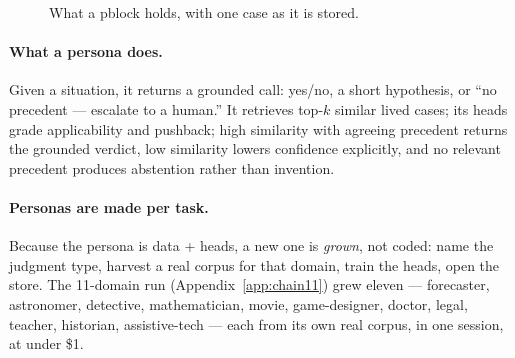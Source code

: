 \documentclass[11pt]{article}
\begin{document}
\begin{figure}[htbp]
\centering
{}
\caption{What a pblock holds, with one case as it is stored.}
\label{fig:keyidea}
\end{figure}

\paragraph{What a persona does.} Given a situation, it returns a grounded call: yes/no, a short hypothesis, or ``no precedent --- escalate to a human.'' It retrieves top-$k$ similar lived cases; its heads grade applicability and pushback; high similarity with agreeing precedent returns the grounded verdict, low similarity lowers confidence explicitly, and no relevant precedent produces abstention rather than invention.

\paragraph{Personas are made per task.} Because the persona is data + heads, a new one is \emph{grown}, not coded: name the judgment type, harvest a real corpus for that domain, train the heads, open the store. The 11-domain run (Appendix~\ref{app:chain11}) grew eleven --- forecaster, astronomer, detective, mathematician, movie, game-designer, doctor, legal, teacher, historian, assistive-tech --- each from its own real corpus, in one session, at under \$1.
\end{document}
